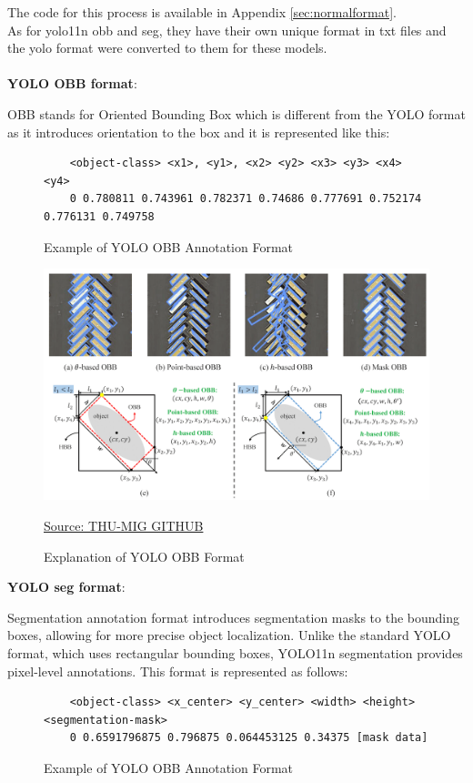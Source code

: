 The code for this process is available in Appendix \ref{sec:normalformat}.
\\

As for yolo11n obb and seg, they have their own unique format in txt files and the yolo format were converted to them for these models.
\\
\\
\textbf{YOLO OBB format}: 

OBB stands for Oriented Bounding Box which is different from the YOLO format as it introduces orientation to the box and it is represented like this:
\\
\begin{figure}[H]
    \centering
    \begin{verbatim}
    <object-class> <x1>, <y1>, <x2> <y2> <x3> <y3> <x4> <y4>
    0 0.780811 0.743961 0.782371 0.74686 0.777691 0.752174 0.776131 0.749758
    \end{verbatim}
    \caption{Example of YOLO OBB Annotation Format}
    \label{fig:ann yoloobb}
\end{figure}

\begin{figure}[H]
    \centering
    \includegraphics[width=0.8\linewidth]{figures/obbformat.png}
    \caption{Explanation of YOLO OBB Format} \href{https://github.com/THU-MIG/yolov10/blob/main/docs/en/datasets/obb/index.md}{Source: THU-MIG GITHUB}
    \label{fig:obb explnationl}
\end{figure}


\textbf{YOLO seg format}: 

Segmentation annotation format introduces segmentation masks to the bounding boxes, allowing for more precise object localization. Unlike the standard YOLO format, which uses rectangular bounding boxes, YOLO11n segmentation provides pixel-level annotations. This format is represented as follows:


\begin{figure}[h]
    \centering
    \begin{verbatim}
    <object-class> <x_center> <y_center> <width> <height> <segmentation-mask> 
    0 0.6591796875 0.796875 0.064453125 0.34375 [mask data]
    \end{verbatim}
    \caption{Example of YOLO OBB Annotation Format}
    \label{fig:ann yoloobb}
\end{figure}

